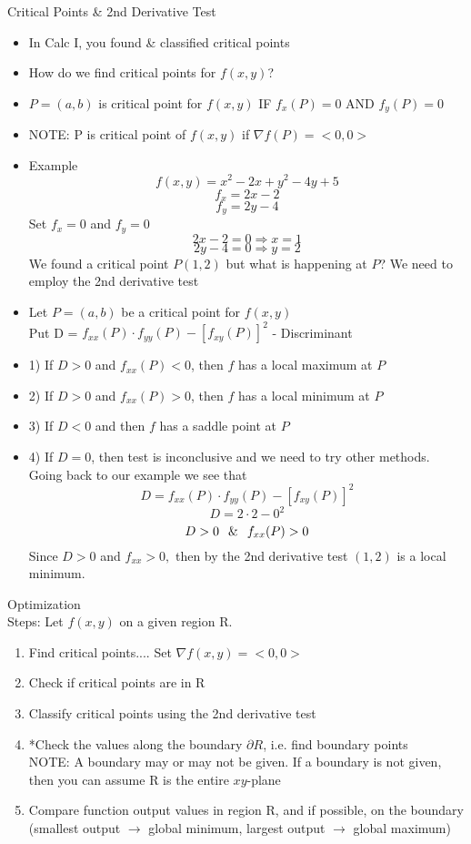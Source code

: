 \documentclass[12pt,letterpaper, onecolumn]{exam}
\begin{document}
		\noindent Critical Points \& 2nd Derivative Test\\
		\begin{itemize}
			\item In Calc I, you found \& classified critical points
			\item How do we find critical points for $f(x,y)$?
			\item $P=(a,b)$ is critical point for $f(x,y)$ IF $f_x(P)=0$ AND $f_y(P)=0$
			\item NOTE: P is critical point of $f(x,y)$ if $\nabla f(P)=<0,0>$
			\item Example
			$$f(x,y)=x^2-2x+y^2-4y+5$$
			$$f_x=2x-2$$
			$$f_y=2y-4$$
			Set $f_x=0$ and $f_y=0$
				$$2x-2=0 \Longrightarrow x=1$$
			$$2y-4=0 \Longrightarrow y=2$$
			We found a critical point $P(1,2)$ but what is happening at $P$? We need to employ the 2nd derivative test
			\item Let $P=(a,b)$ be a critical point for $f(x,y)$\\
			Put D = $f_{xx}(P)\cdot f_{yy}(P)-[f_{xy}(P)]^2$ - Discriminant
			\item 1) If $D>0$ and $f_{xx}(P)<0$, then $f$ has a local maximum at $P$
			\item 2) If $D>0$ and $f_{xx}(P)>0$, then $f$ has a local minimum at $P$
			\item 3) If $D<0$ and then $f$ has a saddle point at $P$
			\item 4) If $D=0$, then test is inconclusive and we need to try other methods.\\
			Going back to our example we see that
			$$D=f_{xx}(P)\cdot f_{yy}(P)-[f_{xy}(P)]^2$$
			$$D=2\cdot2-0^2$$
			$$D>0 \hspace*{0.25cm}\&\hspace*{0.25cm} f_{xx}(P)>0$$
			Since $D>0$ and $f_{xx}>0,$ then by the 2nd derivative test $(1,2)$ is a local minimum.
		\end{itemize}
		\noindent Optimization\\
		Steps: Let $f(x,y)$ on a given region R.
		\begin{enumerate}
			\item Find critical points.... Set $\nabla f(x,y)=<0,0>$
			\item Check if critical points are in R
			\item Classify critical points using the 2nd derivative test
			\item *Check the values along the boundary $\partial R$, i.e. find boundary points\\
			NOTE: A boundary may or may not be given. If a boundary is not given, then you can assume R is the entire $xy$-plane
			\item Compare function output values in region R, and if possible, on the boundary (smallest output $\rightarrow$ global minimum, largest output  $\rightarrow$  global maximum)
		\end{enumerate}
\end{document}
